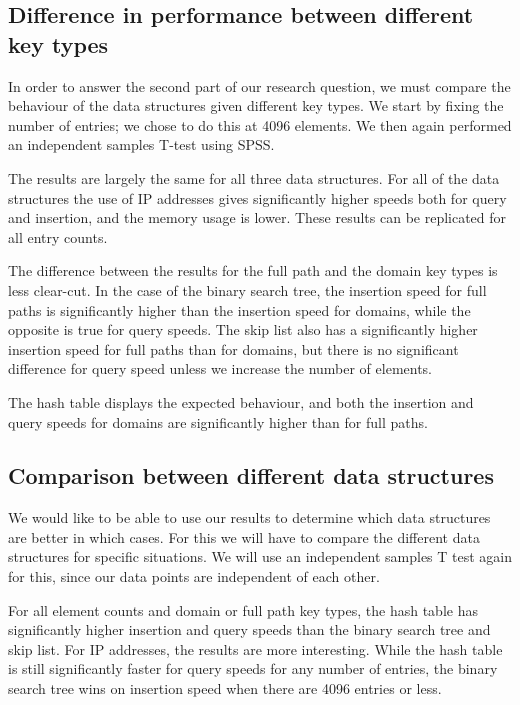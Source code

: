 \documentclass[12pt,a4paper]{article}
\begin{document}
    \subsection{Difference in performance between different key types}

    In order to answer the second part of our research question, we must compare the behaviour of
    the data structures given different key types.  We start by fixing the number of entries; we
    chose to do this at 4096 elements.  We then again performed an independent samples T-test
    using SPSS.

    The results are largely the same for all three data structures. For all of the data structures
    the use of IP addresses gives significantly higher speeds both for query and insertion, and the
    memory usage is lower.  These results can be replicated for all entry counts.

    The difference between the results for the full path and the domain key types is less clear-cut.
    In the case of the binary search tree, the insertion speed for full paths is significantly higher
    than the insertion speed for domains, while the opposite is true for query speeds.  The skip
    list also has a significantly higher insertion speed for full paths than for domains, but there
    is no significant difference for query speed unless we increase the number of elements.

    The hash table displays the expected behaviour, and both the insertion and query speeds for
    domains are significantly higher than for full paths.

    \subsection{Comparison between different data structures}

    We would like to be able to use our results to determine which data structures are better in
    which cases.  For this we will have to compare the different data structures for specific
    situations. We will use an independent samples T test again for this, since our data points are
    independent of each other.

    For all element counts and domain or full path key types, the hash table has significantly higher insertion
    and query speeds than the binary search tree and skip list.  For IP addresses, the results are
    more interesting.  While the hash table is still significantly faster for query speeds for any
    number of entries, the binary search tree wins on insertion speed when there are 4096 entries or
    less.
\end{document}
